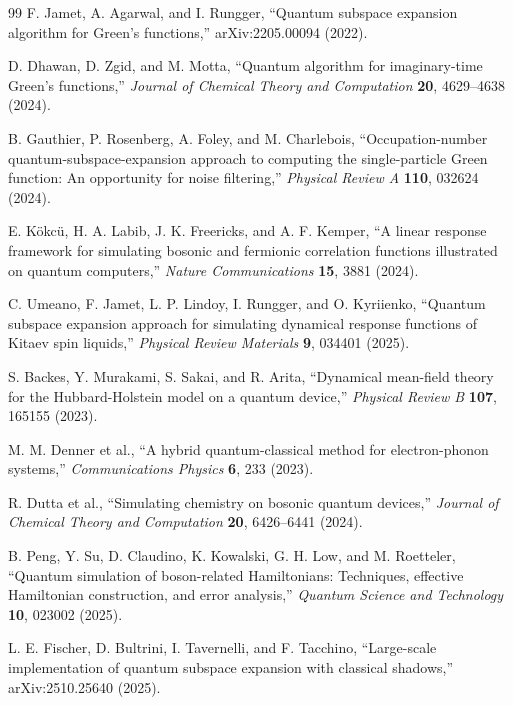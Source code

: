 \documentclass[
  reprint,
  amsmath,
  amssymb,
  aps,
  pra,
  nofootinbib,
  superscriptaddress,
  floatfix
]{revtex4-2}
\begin{document}
\begin{thebibliography}{99}
F. Jamet, A. Agarwal, and I. Rungger,
``Quantum subspace expansion algorithm for Green's functions,''
arXiv:2205.00094 (2022).

D. Dhawan, D. Zgid, and M. Motta,
``Quantum algorithm for imaginary-time Green's functions,''
\emph{Journal of Chemical Theory and Computation} \textbf{20}, 4629--4638 (2024).

B. Gauthier, P. Rosenberg, A. Foley, and M. Charlebois,
``Occupation-number quantum-subspace-expansion approach to computing the single-particle Green function: An opportunity for noise filtering,''
\emph{Physical Review A} \textbf{110}, 032624 (2024).

E. K\"okc\"u, H. A. Labib, J. K. Freericks, and A. F. Kemper,
``A linear response framework for simulating bosonic and fermionic correlation functions illustrated on quantum computers,''
\emph{Nature Communications} \textbf{15}, 3881 (2024).

C. Umeano, F. Jamet, L. P. Lindoy, I. Rungger, and O. Kyriienko,
``Quantum subspace expansion approach for simulating dynamical response functions of Kitaev spin liquids,''
\emph{Physical Review Materials} \textbf{9}, 034401 (2025).

S. Backes, Y. Murakami, S. Sakai, and R. Arita,
``Dynamical mean-field theory for the Hubbard-Holstein model on a quantum device,''
\emph{Physical Review B} \textbf{107}, 165155 (2023).

M. M. Denner et al.,
``A hybrid quantum-classical method for electron-phonon systems,''
\emph{Communications Physics} \textbf{6}, 233 (2023).

R. Dutta et al.,
``Simulating chemistry on bosonic quantum devices,''
\emph{Journal of Chemical Theory and Computation} \textbf{20}, 6426--6441 (2024).

B. Peng, Y. Su, D. Claudino, K. Kowalski, G. H. Low, and M. Roetteler,
``Quantum simulation of boson-related Hamiltonians: Techniques, effective Hamiltonian construction, and error analysis,''
\emph{Quantum Science and Technology} \textbf{10}, 023002 (2025).

L. E. Fischer, D. Bultrini, I. Tavernelli, and F. Tacchino,
``Large-scale implementation of quantum subspace expansion with classical shadows,''
arXiv:2510.25640 (2025).

\end{thebibliography}
\end{document}
